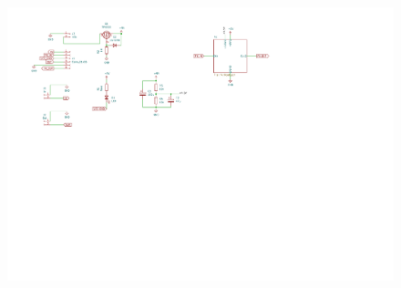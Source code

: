 \documentclass[a4paper,12pt]{article}
\begin{document}
\begin{figure}[h!]
  \centering
  \includegraphics[width=1.3\textwidth, trim={0 4cm 0cm 0cm}, page=2, clip, angle=-90]{schem.pdf}
\end{figure}

\pagebreak
\newgeometry{}
\restoregeometry{}

\begin{versionhistory}
\end{versionhistory}
\end{document}
